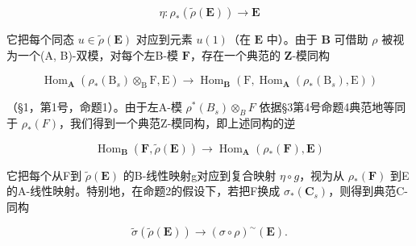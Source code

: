 \[
\eta : \rho_ {*} (\tilde {\rho} (\mathbf {E})) \rightarrow \mathbf {E}\tag{7}
\]

它把每个同态 \(u \in \tilde{\rho}(\mathbf{E})\) 对应到元素 \(u(1)\)（在 \(\mathbf{E}\) 中）。由于 \(\mathbf{B}\) 可借助 \(\rho\) 被视为一个(A, B)-双模，对每个左B-模 \(\mathbf{F}\)，存在一个典范的 \(\mathbf{Z}\)-模同构

\[
\operatorname{Hom} _ {\mathbf {A}} \left(\rho_ {*} (\mathrm{B} _ {s}) \otimes_ {\mathrm{B}} \mathrm{F}, \mathrm{E}\right)\rightarrow \operatorname{Hom} _ {\mathbf {B}} (\mathrm{F}, \operatorname{Hom} _ {\mathbf {A}} \left(\rho_ {*} (\mathrm{B} _ {s}), \mathrm{E}\right))
\]

（§1，第1号，命题1）。由于左A-模 \(\rho^{*}(B_{s}) \otimes_{B} F\) 依据§3第4号命题4典范地等同于 \(\rho_{*}(F)\)，我们得到一个典范Z-模同构，即上述同构的逆

\[
\operatorname{Hom} _ {\mathbf {B}} (\mathbf {F}, \tilde {\rho} (\mathbf {E})) \rightarrow \operatorname{Hom} _ {\mathbf {A}} (\rho_ {*} (\mathbf {F}), \mathbf {E})\tag{8}
\]

它把每个从F到 \(\tilde{\rho}(\mathbf{E})\) 的B-线性映射g对应到复合映射 \(\eta \circ g\)，视为从 \(\rho_{*}(\mathbf{F})\) 到E的A-线性映射。特别地，在命题2的假设下，若把F换成 \(\sigma_{*}(\mathbf{C}_{s})\)，则得到典范C-同构

\[
\tilde {\sigma} (\tilde {\rho} (\mathbf {E})) \rightarrow (\sigma \circ \rho) ^ {\sim} (\mathbf {E}).\tag{9}
\]

